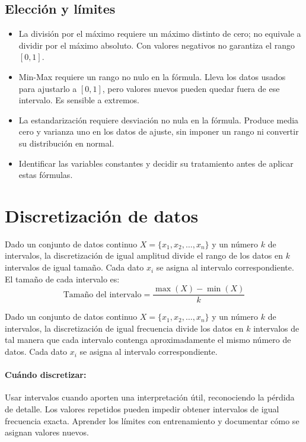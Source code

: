 \documentclass[a4,11pt]{aleph-notas}
\begin{document}
\subsection*{Elección y límites}
\begin{itemize}[leftmargin=*]
    \item La división por el máximo requiere un máximo distinto de cero; no equivale a dividir por el máximo absoluto. Con valores negativos no garantiza el rango $[0,1]$.
    \item Min-Max requiere un rango no nulo en la fórmula. Lleva los datos usados para ajustarlo a $[0,1]$, pero valores nuevos pueden quedar fuera de ese intervalo. Es sensible a extremos.
    \item La estandarización requiere desviación no nula en la fórmula. Produce media cero y varianza uno en los datos de ajuste, sin imponer un rango ni convertir su distribución en normal.
    \item Identificar las variables constantes y decidir su tratamiento antes de aplicar estas fórmulas.
\end{itemize}

\section{Discretización de datos}

\begin{defi}
    Dado un conjunto de datos continuo \(X = \{x_1, x_2, \ldots, x_n\}\) y un número \(k\) de intervalos, la discretización de igual amplitud divide el rango de los datos en \(k\) intervalos de igual tamaño. Cada dato \(x_i\) se asigna al intervalo correspondiente. El tamaño de cada intervalo es:
    \[
    \text{Tamaño del intervalo} = \frac{\max(X) - \min(X)}{k}
    \]
\end{defi}

\begin{defi}
    Dado un conjunto de datos continuo \(X = \{x_1, x_2, \ldots, x_n\}\) y un número \(k\) de intervalos, la discretización de igual frecuencia divide los datos en \(k\) intervalos de tal manera que cada intervalo contenga aproximadamente el mismo número de datos. Cada dato \(x_i\) se asigna al intervalo correspondiente.
\end{defi}

\paragraph{Cuándo discretizar:} Usar intervalos cuando aporten una interpretación útil, reconociendo la pérdida de detalle. Los valores repetidos pueden impedir obtener intervalos de igual frecuencia exacta. Aprender los límites con entrenamiento y documentar cómo se asignan valores nuevos.
\end{document}
